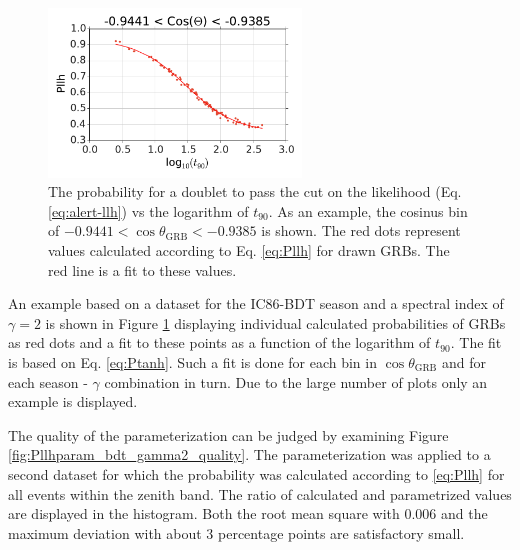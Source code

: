 \begin{figure}[h]
 \centering
 \captionsetup{width=0.85\textwidth}
\includegraphics[width=0.6\textwidth]{fig/Pllh_example_g2_bdt.pdf}

\caption{The probability for a doublet to pass 
the cut on the likelihood (Eq. 
\ref{eq:alert-llh}) vs the logarithm of 
$t_{90}$. As an example, the cosinus bin of $-0.9441 < \cos \theta_\text{GRB} 
< -0.9385$ is shown. The red dots represent values calculated according to Eq. 
\ref{eq:Pllh} for drawn GRBs. The red line is a fit to these values. 
\label{fig:Pllh_example_g2_bdt}}
\end{figure}

An example based on a dataset for the IC86-BDT season and a spectral index of 
$\gamma=2$ is shown in Figure
\ref{fig:Pllh_example_g2_bdt} displaying individual calculated probabilities of 
GRBs as red dots and a fit to these points as a function of the logarithm of 
$t_{90}$. The fit is based on Eq. \ref{eq:Ptanh}. Such a fit is done for each 
bin in $\cos \theta_\text{GRB}$ and for each season - $\gamma$ combination in 
turn. Due to the large number of plots only an example is displayed.

The quality of the parameterization can be judged by examining Figure 
\ref{fig:Pllhparam_bdt_gamma2_quality}. The parameterization was applied to a 
second dataset for which the probability was calculated according to 
\ref{eq:Pllh} for all events within the zenith band. The ratio of calculated 
and parametrized values are displayed in the histogram. Both the root mean 
square with $0.006$ and the maximum deviation with about 3 
percentage points are satisfactory small. 

